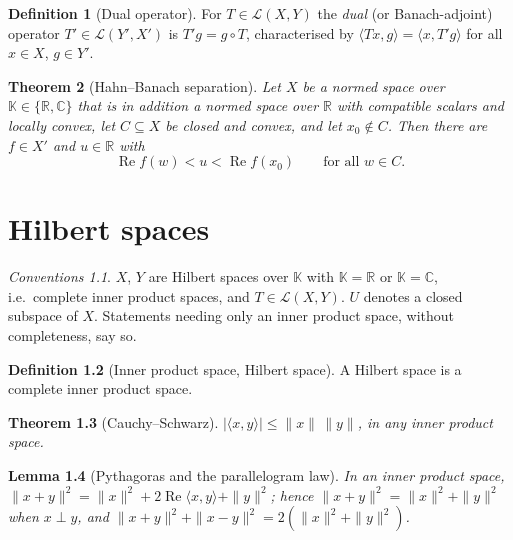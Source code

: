 \documentclass[a4paper]{report}
\theoremstyle{plain}
\newtheorem{theorem}{Theorem}[chapter]
\newtheorem{lemma}[theorem]{Lemma}
\theoremstyle{definition}
\newtheorem{definition}[theorem]{Definition}
\theoremstyle{remark}
\newtheorem{assumptions}[theorem]{Conventions}
\begin{document}
\begin{definition}[Dual operator]
  \label{def_dual_operator}
  For $T \in \mathcal{L}(X,Y)$ the \emph{dual} (or Banach-adjoint) operator
  $T' \in \mathcal{L}(Y',X')$ is $T'g = g \circ T$, characterised by
  $\langle Tx, g\rangle = \langle x, T'g\rangle$ for all $x \in X$, $g \in Y'$.
\end{definition}



\begin{theorem}[Hahn--Banach separation]
  \label{thm_hahn_banach_separation}
  Let $X$ be a normed space over $\mathbb{K} \in \{\mathbb{R},\mathbb{C}\}$ that is in
  addition a normed space over $\mathbb{R}$ with compatible scalars and locally convex, let
  $C \subseteq X$ be closed and convex, and let $x_0 \notin C$.  Then there are $f \in X'$
  and $u \in \mathbb{R}$ with
  \[
    \operatorname{Re}f(w) < u < \operatorname{Re}f(x_0) \qquad \text{for all } w \in C .
  \]
\end{theorem}



\chapter{Hilbert spaces}
\label{ch_03_hilbert_spaces}

\begin{assumptions}
  \label{asm_hilbert_spaces}
  $X$, $Y$ are Hilbert spaces over $\mathbb{K}$ with
$\mathbb{K} = \mathbb{R}$ or $\mathbb{K} = \mathbb{C}$, i.e.\ complete inner product spaces, and
$T \in \mathcal{L}(X,Y)$.  $U$ denotes a closed subspace of $X$.  Statements needing only
an inner product space, without completeness, say so.
\end{assumptions}

\begin{definition}[Inner product space, Hilbert space]
  \label{def_hilbert}
  A Hilbert space is a complete inner product space.
\end{definition}


\begin{theorem}[Cauchy--Schwarz]
  \label{thm_cauchy_schwarz}
  $|\langle x, y\rangle| \le \|x\|\,\|y\|$, in any inner product space.
\end{theorem}


\begin{lemma}[Pythagoras and the parallelogram law]
  \label{lem_pythagoras}
  In an inner product space,
  $\|x+y\|^2 = \|x\|^2 + 2\operatorname{Re}\langle x,y\rangle + \|y\|^2$; hence
  $\|x+y\|^2 = \|x\|^2+\|y\|^2$ when $x \perp y$, and
  $\|x+y\|^2 + \|x-y\|^2 = 2(\|x\|^2+\|y\|^2)$.
\end{lemma}
\end{document}
